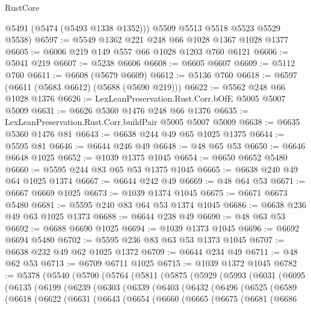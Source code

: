 \begin{lexlean}{RustCore}
\begin{coremodule}
        @5491
        (@5474 (@5493 @1338 @1352)))
      @5509
      @5513
      @5518
      @5523
      @5529
      @5538)
@6597 := @5549 @1362 @221 @248 @66 @1028 @1367 @1028 @1377
@6605 := @6006 @219 @149 @557 @66 @1028 @1203 @760 @6121
@6606 := @5041 @219
@6607 := @5238 @6606
@6608 := @6605 @6607
@6609 := @5112 @760
@6611 := @6608 (@5679 @6609)
@6612 := @5136 @760
@6618 := @6597 (@6611 (@5683 @6612) (@5688 (@5690 @219)))
@6622 := @5562 @248 @66 @1028 @1376
@6626 := LexLeanPreservation.Rust.Corr.bOfE @5005 @5007 @5009
@6631 := @6626 @5360 @1476 @248 @66 @1376
@6635 := LexLeanPreservation.Rust.Corr.buildPair @5005 @5007 @5009
@6638 := @6635 @5360 @1476 @81
@6643 := @6638 @244 @49 @65 @1025 @1375
@6644 := @5595 @81
@6646 := @6644 @246 @49
@6648 := @48 @65 @53
@6650 := @6646 @6648 @1025
@6652 := @1039 @1375 @1045
@6654 := @6650 @6652 @5480
@6660 := @5595 @244 @83 @65 @53 @1375 @1045
@6665 := @6638 @240 @49 @64 @1025 @1374
@6667 := @6644 @242 @49
@6669 := @48 @64 @53
@6671 := @6667 @6669 @1025
@6673 := @1039 @1374 @1045
@6675 := @6671 @6673 @5480
@6681 := @5595 @240 @83 @64 @53 @1374 @1045
@6686 := @6638 @236 @49 @63 @1025 @1373
@6688 := @6644 @238 @49
@6690 := @48 @63 @53
@6692 := @6688 @6690 @1025
@6694 := @1039 @1373 @1045
@6696 := @6692 @6694 @5480
@6702 := @5595 @236 @83 @63 @53 @1373 @1045
@6707 := @6638 @232 @49 @62 @1025 @1372
@6709 := @6644 @234 @49
@6711 := @48 @62 @53
@6713 := @6709 @6711 @1025
@6715 := @1039 @1372 @1045
@6782 := @5378
    (@5540
      (@5700
        (@5764
          (@5811
            (@5875
              (@5929
                (@5993
                  (@6031
                    (@6095
                      (@6135
                        (@6199
                          (@6239
                            (@6303
                              (@6339
                                (@6403
                                  (@6432
                                    (@6496
                                      (@6525
                                        (@6589
                                          (@6618
                                            (@6622
                                              (@6631
                                                (@6643
                                                  (@6654
                                                    (@6660
                                                      (@6665
                                                        (@6675
                                                          (@6681
                                                            (@6686

\end{coremodule}
\end{lexlean}
